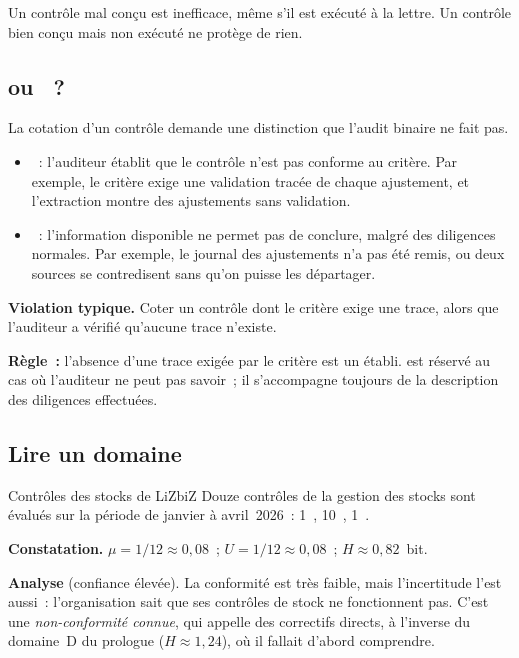 Un contrôle mal conçu est inefficace, même s'il est exécuté à la lettre. Un
contrôle bien conçu mais non exécuté ne protège de rien.

\subsection{\NON{} ou \NEK{}~?}

La cotation d'un contrôle demande une distinction que l'audit binaire ne
fait pas.

\begin{itemize}
    \item \textbf{\NON{}}~: l'auditeur établit que le contrôle n'est pas
          conforme au critère. Par exemple, le critère exige une validation
          tracée de chaque ajustement, et l'extraction montre des
          ajustements sans validation.
    \item \textbf{\NEK{}}~: l'information disponible ne permet pas de
          conclure, malgré des diligences normales. Par exemple, le journal
          des ajustements n'a pas été remis, ou deux sources se contredisent
          sans qu'on puisse les départager.
\end{itemize}

\begin{boxalert}
\textbf{Violation typique.} Coter \NEK{} un contrôle dont le critère exige une
trace, alors que l'auditeur a vérifié qu'aucune trace n'existe.

\smallskip
\textbf{Règle~:} l'absence d'une trace exigée par le critère est un \NON{}
établi. \NEK{} est réservé au cas où l'auditeur ne peut pas savoir~; il
s'accompagne toujours de la description des diligences effectuées.
\end{boxalert}

\subsection{Lire un domaine}

\begin{boxlecture}{Contrôles des stocks de LiZbiZ}
Douze contrôles de la gestion des stocks sont évalués sur la période de
janvier à avril~2026~: 1~\OUI{}, 10~\NON{}, 1~\NEK{}.

\medskip
\textbf{Constatation.} $\mu = 1/12 \approx 0{,}08$~; $U = 1/12 \approx 0{,}08$~;
$H \approx 0{,}82$~bit.

\medskip
\textbf{Analyse} (confiance élevée). La conformité est très faible, mais
l'incertitude l'est aussi~: l'organisation sait que ses contrôles de stock
ne fonctionnent pas. C'est une \emph{non-conformité connue}, qui appelle des
correctifs directs, à l'inverse du domaine~D du prologue ($H \approx 1{,}24$),
où il fallait d'abord comprendre.

\medskip
\hfill{}
\end{boxlecture}

